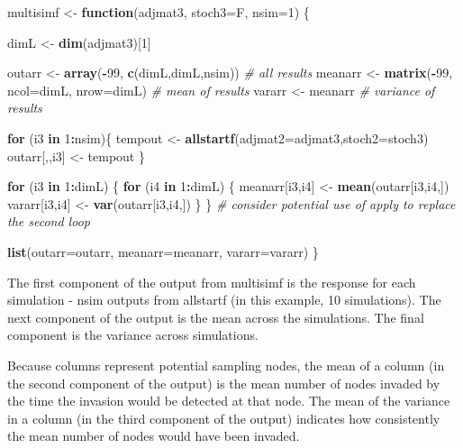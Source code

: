 \documentclass[]{article}
\newenvironment{Shaded}{\begin{snugshade}}{\end{snugshade}}
\newcommand{\KeywordTok}[1]{\textcolor[rgb]{0.13,0.29,0.53}{\textbf{#1}}}
\newcommand{\DataTypeTok}[1]{\textcolor[rgb]{0.13,0.29,0.53}{#1}}
\newcommand{\DecValTok}[1]{\textcolor[rgb]{0.00,0.00,0.81}{#1}}
\newcommand{\StringTok}[1]{\textcolor[rgb]{0.31,0.60,0.02}{#1}}
\newcommand{\CommentTok}[1]{\textcolor[rgb]{0.56,0.35,0.01}{\textit{#1}}}
\newcommand{\ControlFlowTok}[1]{\textcolor[rgb]{0.13,0.29,0.53}{\textbf{#1}}}
\newcommand{\OperatorTok}[1]{\textcolor[rgb]{0.81,0.36,0.00}{\textbf{#1}}}
\newcommand{\NormalTok}[1]{#1}
\begin{document}
\begin{Shaded}
\begin{Highlighting}[]
\NormalTok{multisimf <-}\StringTok{ }\ControlFlowTok{function}\NormalTok{(adjmat3, }\DataTypeTok{stoch3=}\NormalTok{F, }\DataTypeTok{nsim=}\DecValTok{1}\NormalTok{) \{}

\NormalTok{  dimL <-}\StringTok{ }\KeywordTok{dim}\NormalTok{(adjmat3)[}\DecValTok{1}\NormalTok{]}

\NormalTok{  outarr <-}\StringTok{ }\KeywordTok{array}\NormalTok{(}\OperatorTok{-}\DecValTok{99}\NormalTok{, }\KeywordTok{c}\NormalTok{(dimL,dimL,nsim)) }\CommentTok{# all results}
\NormalTok{  meanarr <-}\StringTok{ }\KeywordTok{matrix}\NormalTok{(}\OperatorTok{-}\DecValTok{99}\NormalTok{, }\DataTypeTok{ncol=}\NormalTok{dimL, }\DataTypeTok{nrow=}\NormalTok{dimL) }\CommentTok{# mean of results}
\NormalTok{  vararr <-}\StringTok{ }\NormalTok{meanarr }\CommentTok{# variance of results}

  \ControlFlowTok{for}\NormalTok{ (i3 }\ControlFlowTok{in} \DecValTok{1}\OperatorTok{:}\NormalTok{nsim)\{}
\NormalTok{    tempout <-}\StringTok{ }\KeywordTok{allstartf}\NormalTok{(}\DataTypeTok{adjmat2=}\NormalTok{adjmat3,}\DataTypeTok{stoch2=}\NormalTok{stoch3)}
\NormalTok{    outarr[,,i3] <-}\StringTok{ }\NormalTok{tempout}
\NormalTok{  \}}

  \ControlFlowTok{for}\NormalTok{ (i3 }\ControlFlowTok{in} \DecValTok{1}\OperatorTok{:}\NormalTok{dimL) \{}
    \ControlFlowTok{for}\NormalTok{ (i4 }\ControlFlowTok{in} \DecValTok{1}\OperatorTok{:}\NormalTok{dimL) \{}
\NormalTok{      meanarr[i3,i4] <-}\StringTok{ }\KeywordTok{mean}\NormalTok{(outarr[i3,i4,])}
\NormalTok{      vararr[i3,i4] <-}\StringTok{ }\KeywordTok{var}\NormalTok{(outarr[i3,i4,])}
\NormalTok{  \} \}}
\CommentTok{# consider potential use of apply to replace the second loop}

  \KeywordTok{list}\NormalTok{(}\DataTypeTok{outarr=}\NormalTok{outarr, }\DataTypeTok{meanarr=}\NormalTok{meanarr, }\DataTypeTok{vararr=}\NormalTok{vararr)}
\NormalTok{\}}
\end{Highlighting}
\end{Shaded}

The first component of the output from multisimf is the response for
each simulation - nsim outputs from allstartf (in this example, 10
simulations). The next component of the output is the mean across the
simulations. The final component is the variance across simulations.

Because columns represent potential sampling nodes, the mean of a column
(in the second component of the output) is the mean number of nodes
invaded by the time the invasion would be detected at that node. The
mean of the variance in a column (in the third component of the output)
indicates how consistently the mean number of nodes would have been
invaded.
\end{document}

